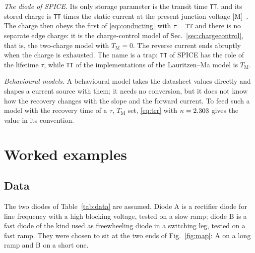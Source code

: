 \documentclass[10pt,a4paper]{scrartcl}
\newcommand{\TM}{T_\mathrm{M}}
\begin{document}
\emph{The diode of SPICE.} Its only storage parameter is the transit time \texttt{TT}, and its stored charge is \texttt{TT} times the static current at the present junction voltage [M]~\cite{nagel1975}. The charge then obeys the first of \eqref{eq:conducting} with $\tau = \texttt{TT}$ and there is no separate edge charge: it is the charge-control model of Sec.~\ref{sec:chargecontrol}, that is, the two-charge model with $\TM = 0$. The reverse current ends abruptly when the charge is exhausted. The name is a trap: \texttt{TT} of SPICE has the role of the lifetime $\tau$, while \texttt{TT} of the implementations of the Lauritzen--Ma model is $\TM$.

\emph{Behavioural models.} A behavioural model takes the datasheet values directly and shapes a current source with them; it needs no conversion, but it does not know how the recovery changes with the slope and the forward current. To feed such a model with the recovery time of a $\tau$, $\TM$ set, \eqref{eq:trr} with $\kappa = 2.303$ gives the value in its convention.

\section{Worked examples}
\label{sec:examples}
\subsection{Data}
The two diodes of Table~\ref{tab:data} are assumed. Diode A is a rectifier diode for line frequency with a high blocking voltage, tested on a slow ramp; diode B is a fast diode of the kind used as freewheeling diode in a switching leg, tested on a fast ramp. They were chosen to sit at the two ends of Fig.~\ref{fig:map}: A on a long ramp and B on a short one.
\end{document}
